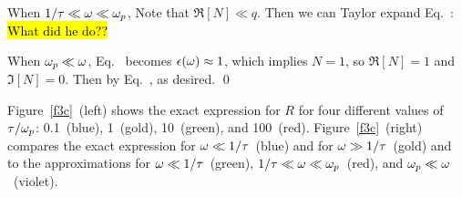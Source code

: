{	When $1 / \tau \ll \omega \ll \omega_p$,
	Note that $\Re[N] \ll q$.  Then we can Taylor expand Eq.~:
	\hl{What did he do??}
	
	When $\omega_p \ll \omega$, Eq.~ becomes $\epsilon(\omega) \approx 1$, which implies $N = 1$, so $\Re[N] = 1$ and $\Im[N] = 0$.  Then by Eq.~,
	as desired. \qed

	Figure~\ref{f3c}~(left) shows the exact expression for $R$ for four different values of $\tau / \omega_p$: 0.1~(blue), 1~(gold), 10~(green), and 100~(red).  Figure~\ref{f3c}~(right) compares the exact expression for $\omega \ll 1 / \tau$~(blue) and for $\omega \gg 1 / \tau$~(gold) and to the approximations for $\omega \ll 1 / \tau$~(green), $1 / \tau \ll \omega \ll \omega_p$~(red), and $\omega_p \ll \omega$~(violet).

}
